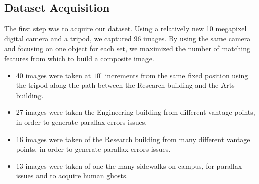 \documentclass[12pt]{amsart}
\begin{document}
\subsection{Dataset Acquisition}
The first step was to acquire our dataset. Using a relatively new 10 megapixel digital camera and a tripod, we captured 96 images. By using the same camera and focusing on one object for each set, we maximized the number of matching features from which to build a composite image.
\begin{itemize}
	\item 40 images were taken at $10^{\circ}$ increments from the same fixed position using the tripod along the path between the Research building and the Arts building.
	\item 27 images were taken the Engineering building from different vantage points, in order to generate parallax errors issues.
	\item 16 images were taken of the Research building from many different vantage points, in order to generate parallax errors issues.
	\item 13 images were taken of one the many sidewalks on campus, for parallax issues and to acquire human ghosts.
\end{itemize}
\end{document}
